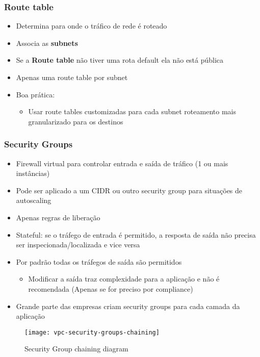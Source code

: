 \begin{frame}
	\frametitle{Route table}
	\begin{itemize}
		\item Determina para onde o tráfico de rede é roteado
		\item Associa as \textbf{subnets}
		\item Se a \textbf{Route table} não tiver uma rota default ela não está pública
		\item Apenas uma route table por subnet
		\item Boa prática:
			\begin{itemize}
				\item Usar route tables customizadas para cada subnet roteamento mais granularizado para os destinos
			\end{itemize}
	\end{itemize}
\end{frame}

\begin{frame}[allowframebreaks]
	\frametitle{Security Groups}
	\begin{itemize}
		\item Firewall virtual para controlar entrada e saída de tráfico (1 ou mais instâncias)
		\item Pode ser aplicado a um CIDR ou outro security group para situações de autoscaling
		\item Apenas regras de liberação
		\item Stateful: se o tráfego de entrada é permitido, a resposta de saída não precisa ser inspecionada/localizada e vice versa
		\item Por padrão todas os tráfegos de saída são permitidos
			\begin{itemize}
				\item Modificar a saída traz complexidade para a aplicação e não é recomendada (Apenas se for preciso por compliance)
			\end{itemize}
		\framebreak
		\item Grande parte das empresas criam security groups para cada camada da aplicação

	\end{itemize}
	\begin{figure}[htpb]
		\centering
			\texttt{[image: vpc-security-groups-chaining]}
		\caption{Security Group chaining diagram}
	\end{figure}
\end{frame}

